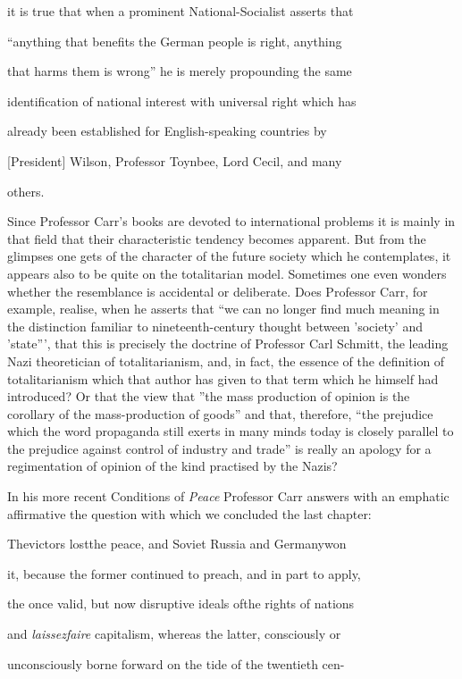 \documentclass[11pt,openany]{book}
\begin{document}
it is true that when a prominent National-Socialist asserts that

``anything that benefits the German people is right, anything

that harms them is wrong'' he is merely propounding the same

identification of national interest with universal right which has

already been established for English-speaking countries by

[President] Wilson, Professor Toynbee, Lord Cecil, and many

others.

Since Professor Carr's books are devoted to international problems it is mainly in that field that their characteristic tendency becomes apparent. But from the glimpses one gets of the character of the future society which he contemplates, it appears also to be quite on the totalitarian model. Sometimes one even wonders whether the resemblance is accidental or deliberate. Does Professor Carr, for example, realise, when he asserts that ``we can no longer find much meaning in the distinction familiar to nineteenth-century thought between 'society' and 'state''', that this is precisely the doctrine of Professor Carl Schmitt, the leading Nazi theoretician of totalitarianism, and, in fact, the essence of the definition of totalitarianism which that author has given to that term which he himself had introduced? Or that the view that ''the mass production of opinion is the corollary of the mass-production of goods'' and that, therefore, ``the prejudice which the word propaganda still exerts in many minds today is closely parallel to the prejudice against control of industry and trade'' is really an apology for a regimentation of opinion of the kind practised by the Nazis?

In his more recent Conditions of \emph{Peace} Professor Carr answers with an emphatic affirmative the question with which we concluded the last chapter:

Thevictors lostthe peace, and Soviet Russia and Germanywon

it, because the former continued to preach, and in part to apply,

the once valid, but now disruptive ideals ofthe rights of nations

and \emph{laissezfaire} capitalism, whereas the latter, consciously or

unconsciously borne forward on the tide of the twentieth cen-
\end{document}
